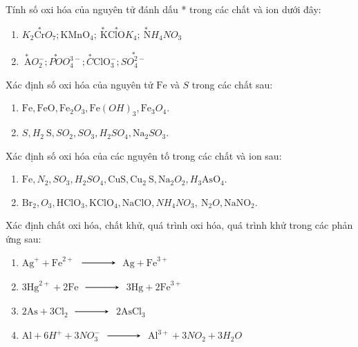 	\begin{bt}
		Tính số oxi hóa của nguyên tử đánh dấu * trong các chất và ion dưới đây:
		\begin{enumerate}
			\item $K_2\stackrel{*}{\mathrm{Cr}} O_7; \mathrm{KMnO}_4; \stackrel{*}{\mathrm{~K}} \stackrel{*}{\mathrm{ClO}} K_4; \stackrel{*}{\mathrm{~N}} H_4NO_3$
			\item $\stackrel{*}{\mathrm{~A}} O_2^{-}; \stackrel{*}{PO} O_4^{3-}; \stackrel{*}{C} \mathrm{ClO}_3^{-}; \stackrel{*}{SO_4^{2-}}$
		\end{enumerate}
	\end{bt}
	\begin{bt}
		Xác định số oxi hóa của nguyên tử $\mathrm{Fe}$ và $S$ trong các chất sau:
		\begin{enumerate}
			\item $\mathrm{Fe}, \mathrm{FeO}, \mathrm{Fe}_2O_3, \mathrm{Fe}(OH)_3, \mathrm{Fe}_3O_4$.
			\item $S, H_2\mathrm{~S}, SO_2, SO_3, H_2SO_4, \mathrm{Na}_2SO_3$.
		\end{enumerate}
	\end{bt}
	\begin{bt}
		Xác định số oxi hóa của các nguyên tố trong các chất và ion sau:
		\begin{enumerate}
			\item $\mathrm{Fe}, N_2, SO_3, H_2SO_4, \mathrm{CuS}, \mathrm{Cu}_2\mathrm{~S}, \mathrm{Na}_2O_2, H_3\mathrm{AsO}_4$.
			\item $\mathrm{Br}_2, O_3, \mathrm{HClO}_3, \mathrm{KClO}_4, \mathrm{NaClO}, NH_4NO_3, \mathrm{~N}_2O, \mathrm{NaNO}_2$.
		\end{enumerate}
	\end{bt}
	\begin{bt}
		Xác định chất oxi hóa, chất khử, quá trình oxi hóa, quá trình khử trong các phản ứng sau:
		\begin{enumerate}
			\item $\mathrm{Ag}^{+}+\mathrm{Fe}^{2+} $ $\xrightarrow$ $ \mathrm{Ag}+\mathrm{Fe}^{3+}$
			\item $3\mathrm{Hg}^{2+}+2\mathrm{Fe} $ $\xrightarrow$ $ 3\mathrm{Hg}+2\mathrm{Fe}^{3+}$
			\item $2\mathrm{As}+3\mathrm{Cl}_2$ $\xrightarrow$ $ 2\mathrm{AsCl}_3$
			\item $\mathrm{Al}+6H^{+}+3NO_3^{-} $ $\xrightarrow$ $ \mathrm{Al}^{3+}+3NO_2+3H_2O$
		\end{enumerate}
		\loigiai{}
	\end{bt}
